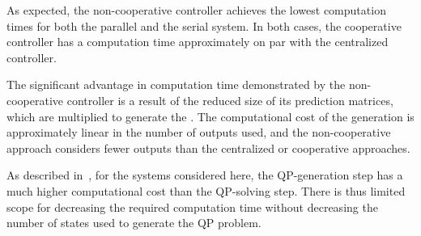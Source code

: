 As expected, the non-cooperative controller achieves the lowest computation times for both the parallel and the serial system.
In both cases, the cooperative controller has a computation time approximately on par with the centralized controller.

The significant advantage in computation time demonstrated by the non-cooperative controller is a result of the reduced size of its prediction matrices, which are multiplied to generate the .
The computational cost of the  generation is approximately linear in the number of outputs used, and the non-cooperative approach considers fewer outputs than the centralized or cooperative approaches.

As described in~\cite{Jones2016}, for the systems considered here, the QP-generation step has a much higher computational cost than the QP-solving step.
There is thus limited scope for decreasing the required computation time without decreasing the number of states used to generate the QP problem.

